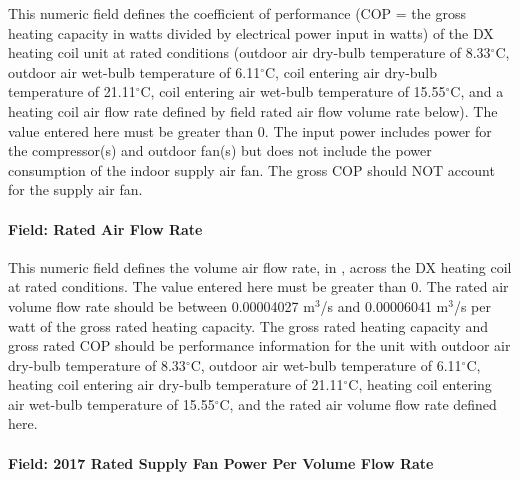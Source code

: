 This numeric field defines the coefficient of performance (COP = the gross heating capacity in watts divided by electrical power input in watts) of the DX heating coil unit at rated conditions (outdoor air dry-bulb temperature of 8.33$^\circ$C, outdoor air wet-bulb temperature of 6.11$^\circ$C, coil entering air dry-bulb temperature of 21.11$^\circ$C, coil entering air wet-bulb temperature of 15.55$^\circ$C, and a heating coil air flow rate defined by field rated air flow volume rate below). The value entered here must be greater than 0. The input power includes power for the compressor(s) and outdoor fan(s) but does not include the power consumption of the indoor supply air fan. The gross COP should NOT account for the supply air fan.

\paragraph{Field: Rated Air Flow Rate}\label{field-rated-air-flow-rate-4}

This numeric field defines the volume air flow rate, in \si{\volumeFlowRate}, across the DX heating coil at rated conditions. The value entered here must be greater than 0. The rated air volume flow rate should be between 0.00004027 m\(^{3}\)/s and 0.00006041 m\(^{3}\)/s per watt of the gross rated heating capacity. The gross rated heating capacity and gross rated COP should be performance information for the unit with outdoor air dry-bulb temperature of 8.33$^\circ$C, outdoor air wet-bulb temperature of 6.11$^\circ$C, heating coil entering air dry-bulb temperature of 21.11$^\circ$C, heating coil entering air wet-bulb temperature of 15.55$^\circ$C, and the rated air volume flow rate defined here.

\paragraph{Field: 2017 Rated Supply Fan Power Per Volume Flow Rate}\label{field-2017-rated-supply-fan-power-per-volume-flow-rate-1}

